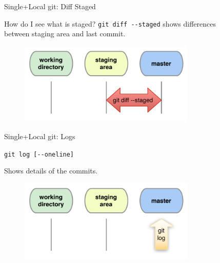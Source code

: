 \documentclass{beamer}
\newcommand{\git}{git\xspace}
\begin{document}

\begin{frame}{Single+Local \git: Diff Staged}
  \begin{block}{How do I see what is staged?}
    \texttt{git diff -{}-staged} shows differences\\ between
    staging area and last commit.
  \end{block}
  \begin{figure}
    \centering
    \includegraphics[width=0.75\textwidth]{own_fig/local-diff-staged}
  \end{figure}
\end{frame}


\begin{frame}{Single+Local \git: Logs}
  \begin{center}
    \texttt{git log [-{}-oneline]}
  \end{center}
  Shows details of the commits.
  \begin{figure}
    \centering
    \includegraphics[width=0.75\textwidth]{figs/local-log}
  \end{figure}
\end{frame}

\end{document}
